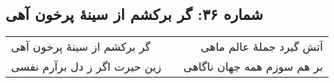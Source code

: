 \begin{center}
\section*{شماره ۳۶: گر برکشم از سینۀ پرخون آهی}
\label{sec:036}
\begin{longtable}{l p{0.5cm} r}
گر برکشم از سینهٔ پرخون آهی
&&
آتش گیرد جملهٔ عالم ماهی
\\
زین حیرت اگر ز دل برآرم نفسی
&&
بر هم سوزم همه جهان ناگاهی
\\
\end{longtable}
\end{center}
